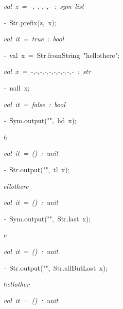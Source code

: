 \begin{list}{}
\item[]\textsl{val\ z\ =\ -,-,-,-,-\ :\ sym\ list}
\item[]\textsl{-\ }Str.prefix(z,\ x);
\item[]\textsl{val\ it\ =\ true\ :\ bool}
\item[]\textsl{-\ }val\ x\ =\ Str.fromString\ "hellothere";
\item[]\textsl{val\ x\ =\ -,-,-,-,-,-,-,-,-,-\ :\ str}
\item[]\textsl{-\ }null\ x;
\item[]\textsl{val\ it\ =\ false\ :\ bool}
\item[]\textsl{-\ }Sym.output("",\ hd\ x);
\item[]\textsl{h}
\item[]\textsl{val\ it\ =\ ()\ :\ unit}
\item[]\textsl{-\ }Str.output("",\ tl\ x);
\item[]\textsl{ellothere}
\item[]\textsl{val\ it\ =\ ()\ :\ unit}
\item[]\textsl{-\ }Sym.output("",\ Str.last\ x);
\item[]\textsl{e}
\item[]\textsl{val\ it\ =\ ()\ :\ unit}
\item[]\textsl{-\ }Str.output("",\ Str.allButLast\ x);
\item[]\textsl{hellother}
\item[]\textsl{val\ it\ =\ ()\ :\ unit}
\end{list}
